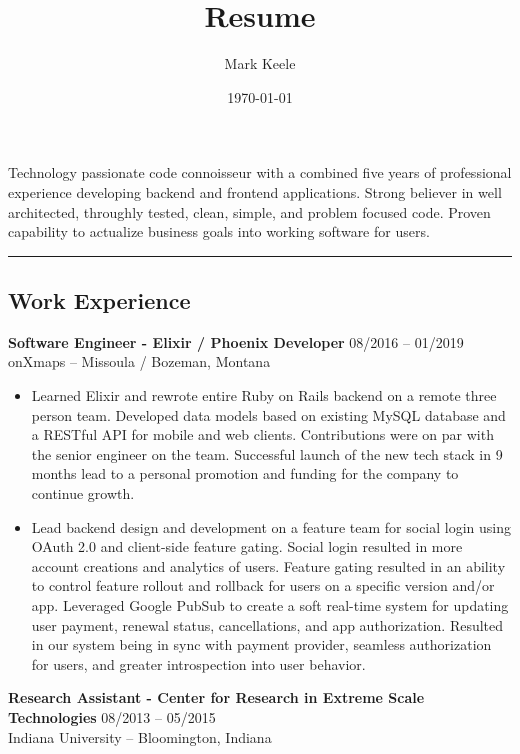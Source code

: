 \documentclass[12pt,letterpaper]{article}
\author{Mark Keele}
\title{Resume}
\date{\today}
\begin{document}
Technology passionate code connoisseur with a combined five years of professional experience developing backend and frontend applications. Strong believer in well architected, throughly tested, clean, simple, and problem focused code. Proven capability to actualize business goals into working software for users.

\noindent\rule{7.5in}{0.4pt}

\subsection*{Work Experience}

\noindent\textbf{Software Engineer - Elixir / Phoenix Developer}
\hfill{08/2016 -- 01/2019} \\
onXmaps -- Missoula / Bozeman, Montana

\begin{itemize}

  \item Learned Elixir and rewrote entire Ruby on Rails backend on a remote three person team. Developed data models based on existing MySQL database and a RESTful API for mobile and web clients. Contributions were on par with the senior engineer on the team. Successful launch of the new tech stack in 9 months lead to a personal promotion and funding for the company to continue growth.

  \item Lead backend design and development on a feature team for social login using OAuth 2.0 and client-side feature gating. Social login resulted in more account creations and analytics of users. Feature gating resulted in an ability to control feature rollout and rollback for users on a specific version and/or app. Leveraged Google PubSub to create a soft real-time system for updating user payment, renewal status, cancellations, and app authorization. Resulted in our system being in sync with payment provider, seamless authorization for users, and greater introspection into user behavior.

\end{itemize}

\noindent\textbf{Research Assistant - Center for Research in Extreme Scale Technologies}
\hfill{08/2013 -- 05/2015} \\
Indiana University -- Bloomington, Indiana
\end{document}
